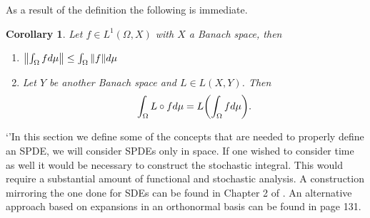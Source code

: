 \documentclass[12pt]{article}
\newtheorem{corollary}{Corollary}
\begin{document}
As a result of the definition the following is immediate.
\begin{corollary}
    Let $f\in L^1(\Omega,X)$ with $X$ a Banach space, then
    \begin{enumerate}
        \item $\norm{\int_\Omega f d\mu}\leq\int_\Omega{\norm{f}d\mu} $
        \item Let $Y$ be another Banach space and $L\in L(X,Y)$. Then
              \begin{equation*}
                  \int_\Omega L\circ f d\mu=L\qty(\int_\Omega f d\mu).
              \end{equation*}
    \end{enumerate}
\end{corollary}
`'In this section we define some of the concepts that are needed to properly define an SPDE, we will consider SPDEs only in space. If one wished to consider time as well it would be necessary to construct the stochastic integral. This would require a substantial amount of functional and stochastic analysis. A construction mirroring the one done for SDEs can be found in Chapter 2 of \cite{liu2015stochastic}. An alternative approach based on expansions in an orthonormal basis can be found in \cite{lototsky2017stochastic} page 131.
\end{document}
